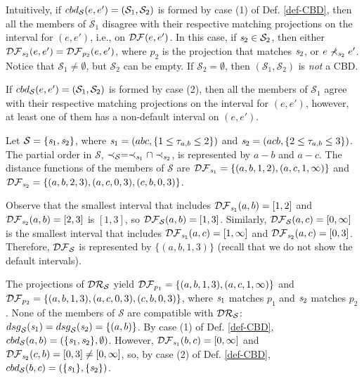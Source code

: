 \noindent
Intuitively, if
${cbd}_{\mathcal{S}}(e,e')=(\mathcal{S}_1,\mathcal{S}_2)$ is formed by case (1)
of Def. \ref{def-CBD}, then all the members of $\mathcal{S}_1$
disagree with their respective
matching projections on the interval for $(e,e')$, i.e.,
on $\mathcal{DF}_{}(e,e')$.
In this case, if $\mathit{s}_2\in\mathcal{S}_2$, then either
$\mathcal{DF}_{\mathit{s}_2}(e,e')=\mathcal{DF}_{p_2}(e,e')$, where $p_2$ is the
projection that matches $\mathit{s}_2$, or $e\not\prec_{\mathit{s}_2}e'$.
Notice that $\mathcal{S}_1\neq\emptyset$, but
$\mathcal{S}_2$ can be empty. If $\mathcal{S}_2=\emptyset$, then
$(\mathcal{S}_1,\mathcal{S}_2)$ is \emph{not} a CBD.

If
${cbd}_{\mathcal{S}}(e,e')=(\mathcal{S}_1,\mathcal{S}_2)$ is formed by case (2),
then all the members of $\mathcal{S}_1$ agree with
their respective matching projections on the interval for $(e,e')$, however,
at least one of them has a non-default interval on $(e,e')$.
\begin{example}
\label{ex-with-time-2}
Let $\mathcal{S}=\{\mathit{s}_1,\mathit{s}_2\}$, where
$\mathit{s}_1=(abc,\{1\leq\tau_{a,b}\leq 2\})$ and
$\mathit{s}_2=(acb,\{2\leq\tau_{a,b}\leq 3\})$.
The partial order in $\mathcal{S}$,
$\prec_{\mathcal{S}}=\prec_{\mathit{s}_1}\cap\prec_{\mathit{s}_2}$, is
represented by $a-b$ and $a-c$.
The distance functions of the members of $\mathcal{S}$ are
$\mathcal{DF}_{\mathit{s}_1}=
\{
(a, b, 1, 2),
 (a, c, 1, \infty)
\}$ and
$\mathcal{DF}_{\mathit{s}_2}=
\{
(a, b, 2, 3),
 (a, c, 0, 3),
  (c, b, 0, 3)
\}$.

Observe that the smallest interval that includes
$\mathcal{DF}_{\mathcal{\mathit{s}}_1}(a,b)=[1,2]$ and
$\mathcal{DF}_{\mathcal{\mathit{s}}_2}(a,b)=[2,3]$ is $[1,3]$,
so $\mathcal{DF}_{\mathcal{S}}(a,b)=[1,3]$.
Similarly,
$\mathcal{DF}_{\mathcal{S}}(a,c)=[0,\infty]$ is the smallest interval that includes
$\mathcal{DF}_{\mathcal{\mathit{s}}_1}(a,c)=[1,\infty]$ and
$\mathcal{DF}_{\mathcal{\mathit{s}}_2}(a,c)=[0,3]$. Therefore,
$\mathcal{DF}_{\mathcal{S}}$ is represented by $\{(a, b, 1, 3)\}$ (recall that
we do not show the default intervals).

The projections of $\mathcal{DR}_{\mathcal{S}}$ yield
 $\mathcal{DF}_{p_1}=
 \{
 (a, b, 1, 3),
  (a, c, 1, \infty)
\}$
 and
$\mathcal{DF}_{p_2}=
\{
 (a,b,1,3),
 (a,c,0,3),
 (c, b, 0, 3)
\}$, where $\mathit{s}_1$ matches $p_1$ and $\mathit{s}_2$ matches $p_2$.
None of the members of $\mathcal{S}$ are compatible with
$\mathcal{DR}_{\mathcal{S}}$:
${dsg}_{\mathcal{S}}(\mathit{s}_1)={dsg}_{\mathcal{S}}(\mathit{s}_2)=\{(a,
b)\}$.
By case (1) of Def. \ref{def-CBD},
${cbd}_{\mathcal{S}}(a,b)=(\{\mathit{s}_1,\mathit{s}_2\},\emptyset)$.
However,
$\mathcal{DF}_{\mathit{s}_1}(b,c)=[0,\infty]$ and
$\mathcal{DF}_{\mathit{s}_2}(c,b)=[0,3]\neq[0,\infty]$, so, by case (2) of
Def. \ref{def-CBD},
${cbd}_{\mathcal{S}}(b,c)=(\{\mathit{s}_1\},\{\mathit{s}_2\})$.
\end{example}
